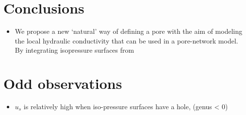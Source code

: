 \documentclass[draft]{agujournal2019}
\begin{document}
\section{Conclusions}
\begin{itemize}
	\item We propose a new `natural' way of defining a pore with the aim of modeling the local hydraulic conductivity that can be used in a pore-network model. By integrating isopressure surfaces from  
\end{itemize}

\section{Odd observations}
\begin{itemize}
	\item $u_s$ is relatively high when iso-pressure surfaces have a hole, (genus < 0)
\end{itemize}







%
%
%
%
%
%
%
%
%
%
\end{document}
